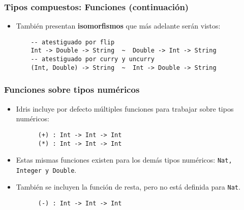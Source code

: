 \documentclass{beamer}
\begin{document}
\begin{frame}[fragile]
  \frametitle{Tipos compuestos: Funciones (continuación)}

  \begin{itemize}
    \item También presentan \textbf{isomorfismos} que más adelante serán vistos:

    \vspace{4pt}
    \begin{verbatim}
    -- atestiguado por flip
    Int -> Double -> String  ~  Double -> Int -> String
    -- atestiguado por curry y uncurry
    (Int, Double) -> String  ~  Int -> Double -> String
    \end{verbatim}
  \end{itemize}

\end{frame}

\begin{frame}[fragile]
  \frametitle{Funciones sobre tipos numéricos}

  \begin{itemize}
    \item Idris incluye por defecto múltiples funciones para trabajar sobre tipos
      numéricos:
      \vspace{4pt}
      \begin{verbatim}
      (+) : Int -> Int -> Int
      (*) : Int -> Int -> Int
      \end{verbatim}
    \item Estas mismas funciones existen para los demás tipos numéricos:
      \texttt{Nat, Integer y Double}.
    \item También se incluyen la función de resta, pero no está definida para
      \texttt{Nat}.
      \vspace{4pt}
      \begin{verbatim}
      (-) : Int -> Int -> Int
      \end{verbatim}
  \end{itemize}

\end{frame}
\end{document}
